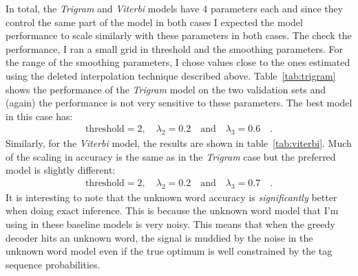 \documentclass[11pt]{article}
\begin{document}
In total, the \emph{Trigram} and \emph{Viterbi} models have 4 parameters each
and since they control the same part of the model in both cases I expected the
model performance to scale similarly with these parameters in both cases.
The check the performance, I ran a small grid in threshold and the smoothing
parameters.
For the range of the smoothing parameters, I chose values close to the ones
estimated using the deleted interpolation technique described above.
Table~\ref{tab:trigram} shows the performance of the \emph{Trigram} model on
the two validation sets and (again) the performance is not very sensitive to
these parameters.
The best model in this case has:
\begin{eqnarray}
\mathrm{threshold} = 2,\quad\lambda_2 = 0.2\quad\mbox{and}\quad
\lambda_3 = 0.6\quad.
\end{eqnarray}
Similarly, for the \emph{Viterbi} model, the results are shown in
table~\ref{tab:viterbi}.
Much of the scaling in accuracy is the same as in the \emph{Trigram} case but
the preferred model is slightly different:
\begin{eqnarray}
\mathrm{threshold} = 2,\quad\lambda_2 = 0.2\quad\mbox{and}\quad
\lambda_3 = 0.7\quad.
\end{eqnarray}
It is interesting to note that the unknown word accuracy is
\emph{significantly} better when doing exact inference.
This is because the unknown word model that I'm using in these baseline models
is very noisy.
This means that when the greedy decoder hits an unknown word, the signal is
muddied by the noise in the unknown word model even if the true optimum is
well constrained by the tag sequence probabilities.
\end{document}
